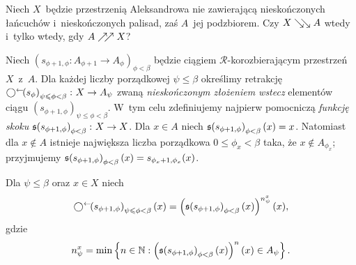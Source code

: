 \begin{problem}\label{prob2}
Niech $X$~będzie przestrzenią Aleksandrowa nie zawierającą nieskończonych łańcuchów i~nieskończonych palisad, zaś $A$~jej podzbiorem. Czy $X\searrow\!\!\searrow A$ wtedy i~tylko wtedy, gdy $A\nearrow\!\!\nearrow X$?
\end{problem}

Niech $\left(s_{\phi+1,\phi}\colon A_{\phi+1}\to A_{\phi}\right)_{\phi<\beta}$ będzie ciągiem $\mathcal{R}$-korozbierającym przestrzeń $X$~z~$A$. Dla każdej liczby porządkowej $\psi\leq \beta$ określimy retrakcję $\bigcirc^\leftarrow\!\!\left(s_{\phi}\right)_{\psi\leqslant \phi<\beta}\colon X\to A_\psi$ zwaną \textit{nieskończonym złożeniem wstecz} elementów ciągu $\left(s_{\phi+1,\phi}\right)_{\psi\leq \phi<\beta}$. W~tym celu zdefiniujemy najpierw pomocniczą \textit{funkcję skoku}\label{def-nieskonczone_zlozenie_korozbierajacego_ciagu}
 $\mathfrak{s}\!\left(s_{\phi+1,\phi}\right)_{\phi<\beta}\colon X\to X$. Dla $x\in A$ niech $\mathfrak{s}\!\left(s_{\phi+1,\phi}\right)_{\phi<\beta}(x)=x$. Natomiast dla $x\not\in A$ istnieje największa liczba porządkowa $0\leq \phi_x<\beta$ taka, że $x\not\in A_{\phi_x}$; przyjmujemy $\mathfrak{s}\!\left(s_{\phi+1,\phi}\right)_{\phi<\beta}(x)=s_{\phi_{x}+1,\phi_{x}}(x)$. 

Dla $\psi\leq\beta$ oraz $x\in X$ niech \[\bigcirc^\leftarrow\!\!\left(s_{\phi+1,\phi}\right)_{\psi\leqslant \phi<\beta}(x)=\left(\mathfrak{s}\!\left(s_{\phi+1,\phi}\right)_{\phi<\beta}(x)\right)^{n^x_\psi}(x),\] gdzie \[n_\psi^x=\min\left\{n\in\mathbb{N}:\left(\mathfrak{s}\!\left(s_{\phi+1,\phi}\right)_{\phi<\beta}(x)\right)^n(x)\in A_\psi\right\}.\]

